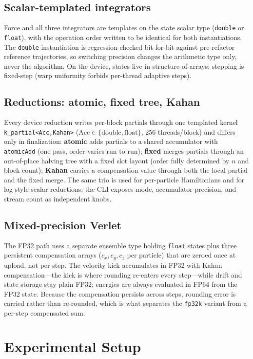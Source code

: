 \documentclass[conference]{IEEEtran}
\begin{document}
\subsection{Scalar-templated integrators}
Force and all three integrators are templates on the state scalar type
(\texttt{double} or \texttt{float}), with the operation order written to be
identical for both instantiations. The \texttt{double} instantiation is
regression-checked bit-for-bit against pre-refactor reference trajectories,
so switching precision changes the arithmetic type only, never the
algorithm. On the device, states live in structure-of-arrays; stepping is
fixed-step (warp uniformity forbids per-thread adaptive steps).

\subsection{Reductions: atomic, fixed tree, Kahan}
Every device reduction writes per-block partials through one templated
kernel \texttt{k\_partial<Acc,Kahan>} ($\text{Acc}\in\{\text{double},
\text{float}\}$, 256 threads/block) and differs only in finalization:
\textbf{atomic} adds partials to a shared accumulator with
\texttt{atomicAdd} (one pass, order varies run to run);
\textbf{fixed} merges partials through an out-of-place halving tree with a
fixed slot layout (order fully determined by $n$ and block count);
\textbf{Kahan} carries a compensation value through both the local partial
and the fixed merge. The same trio is used for per-particle Hamiltonians
and for log-style scalar reductions; the CLI exposes mode, accumulator
precision, and stream count as independent knobs.

\subsection{Mixed-precision Verlet}
The FP32 path uses a separate ensemble type holding \texttt{float} states
plus three persistent compensation arrays ($c_x,c_y,c_z$ per particle)
that are zeroed once at upload, not per step. The velocity kick accumulates
in FP32 with Kahan compensation---the kick is where rounding re-enters every
step---while drift and state storage stay plain FP32; energies are always
evaluated in FP64 from the FP32 state. Because the compensation persists
across steps, rounding error is carried rather than re-rounded, which is
what separates the \texttt{fp32k} variant from a per-step compensated
sum.

\section{Experimental Setup}
\label{sec:setup}
\end{document}
